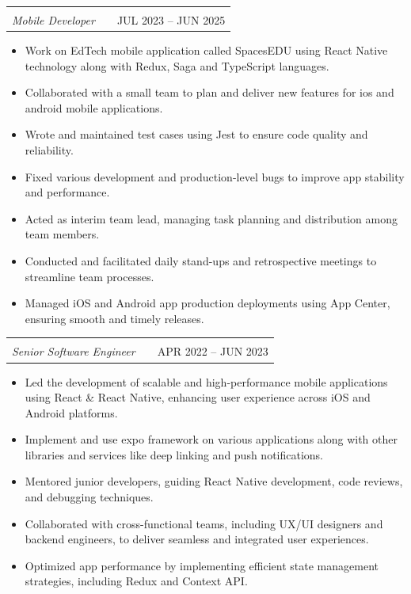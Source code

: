 \documentclass[a4paper,12pt]{article}
\makeatletter
\newenvironment{joblong}[2]
    {
    \begin{tabularx}{\linewidth}{@{}l X r@{}}
    \textbf{#1} & \hfill & #2 \\[3.75pt]
    \end{tabularx}
    \begin{minipage}[t]{\linewidth}
    \begin{itemize}[nosep,after=\strut,leftmargin=1em,itemsep=3pt,label=--]
    }
    {
    \end{itemize}
    \end{minipage}
    }
\newcommand{\jobheading}[2]{%
    \begin{tabular}[t]{@{}l@{}}
    #1\\[-1pt]
    \normalfont\textit{#2}
    \end{tabular}%
}
\makeatother
\begin{document}
\begin{joblong}
{\jobheading{myBlueprint, Toronto, CA}{Mobile Developer}}
{JUL 2023 -- JUN 2025}
\item Work on EdTech mobile application called SpacesEDU using React Native technology along with Redux, Saga and TypeScript languages.
\item Collaborated with a small team to plan and deliver new features for ios and android mobile applications.
\item Wrote and maintained test cases using Jest to ensure code quality and reliability.
\item Fixed various development and production-level bugs to improve app stability and performance.
\item Acted as interim team lead, managing task planning and distribution among team members.
\item Conducted and facilitated daily stand-ups and retrospective meetings to streamline team processes.
\item Managed iOS and Android app production deployments using App Center, ensuring smooth and timely releases.
\end{joblong}

\begin{joblong}
{\jobheading{Swan Softweb Solutions, Gujarat, IN}{Senior Software Engineer}}
{APR 2022 -- JUN 2023}
\item Led the development of scalable and high-performance mobile applications using React \& React Native, enhancing user experience across iOS and Android platforms.
\item Implement and use expo framework on various applications along with other libraries and services like deep linking and push notifications.
\item Mentored junior developers, guiding React Native development, code reviews, and debugging techniques.
\item Collaborated with cross-functional teams, including UX/UI designers and backend engineers, to deliver seamless and integrated user experiences.
\item Optimized app performance by implementing efficient state management strategies, including Redux and Context API.
\end{joblong}
\end{document}
